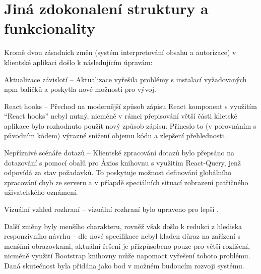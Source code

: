 \section{Jiná zdokonalení struktury a funkcionality}\label{sec:client-improve}

Kromě dvou zásadních změn (systém interpretování obsahu a autorizace) v klientské aplikaci došlo k následujícím úpravám:

\begin{dl}
   \item[Aktualizace závislotí] – Aktualizace vyřešila problémy s instalací vyžadovaných npm balíčků a poskytla nové možnosti pro vývoj.

   \item[React hooks] – Přechod na modernější způsob zápisu React komponent s využitím \enquote{React hooks} nebyl nutný, nicméně v rámci přepisování větší části klietské aplikace bylo rozhodnuto použít nový způsob zápisu.
   Přineslo to (v porovnáním s původním kódem) výrazné snížení objemu kódu a zlepšení přehlednosti.

   \item[Nepříznivé scénáře \g{API} dotazů] – Klientské zpracování  dotazů bylo přepsáno na dotazování s pomocí obalů pro \h{Axios} knihovnu s využitím \h{React-Query}, jenž odpovídá za stav požadavků.
   To poskytuje možnost definování globálního zpracování chyb ze serveru a v příapdě speciálních situací zobrazení patřičného uživatelského oznámení.

   \item[Vizuální vzhled rozhraní] – vizuální rozhraní bylo upraveno pro lepší .
\end{dl}

Další změny byly menšího charakteru, rovněž však došlo k redukci z hlediska responzivního návrhu – dle nové specifikace nebyl kladen důraz na zařízení s menšími obrazovkami, aktuální řešení je přizpůsobeno pouze pro větší rozlišení, nicméně využití Bootstrap knihovny může napomoct vyřešení tohoto problému.
Daná skutečnost byla přidána jako bod v možném budoucím rozvoji systému.

